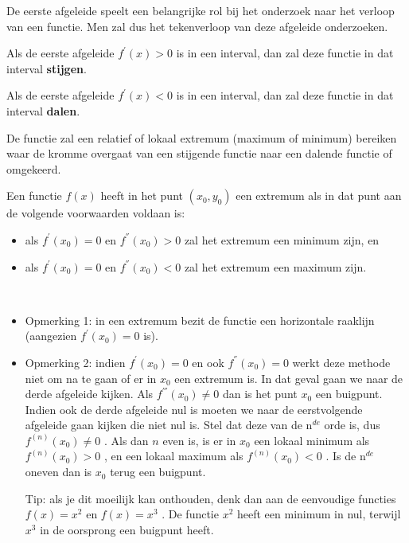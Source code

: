 De eerste afgeleide speelt een belangrijke rol bij het onderzoek
naar het verloop van een functie. Men zal dus het tekenverloop van
deze afgeleide onderzoeken.




\begin{definitie}
	Als de eerste afgeleide $f^{'}(x)>0$ is in een interval,
dan zal deze functie in dat interval \textbf{stijgen}.

Als de eerste afgeleide $f^{'}(x)<0$ is in een interval,
dan zal deze functie in dat interval \textbf{dalen}.

De functie zal een relatief of lokaal extremum (maximum
of minimum) bereiken waar de kromme overgaat van een stijgende functie
naar een dalende functie of omgekeerd.

Een functie $f(x)$ heeft in het punt $(x_{0},y_{0})$ een
extremum als in dat punt aan de volgende voorwaarden voldaan is:

\begin{itemize}
\item als $f^{'}(x_{0})=0$ en $f^{''}(x_{0})>0$ zal het
extremum een minimum zijn, en
\item als $f^{'}(x_{0})=0$ en $f^{''}(x_{0})<0$ zal het
extremum een maximum zijn.
\end{itemize}

\end{definitie}

\begin{opmerking}
	\ \\
	\begin{itemize}
\item Opmerking 1: in een extremum bezit de functie een horizontale
raaklijn (aangezien $f^{'}(x_{0})=0$ is).
\item Opmerking 2: indien $f^{'}(x_{0})=0$ en ook $f^{''}(x_{0})=0$
werkt deze methode niet om na te gaan of er in $x_{0}$ een extremum
is. In dat geval gaan we naar de derde afgeleide kijken. Als $f^{'''}(x_{0})\neq0$
dan is het punt $x_{0}$ een buigpunt. Indien ook de derde afgeleide
nul is moeten we naar de eerstvolgende afgeleide gaan kijken die niet
nul is. Stel dat deze van de n$^{de}$ orde is, dus $f^{(n)}(x_{0})\neq0$
. Als dan $n$ even is, is er in $x_{0}$ een lokaal minimum als $f^{(n)}(x_{0})>0$
, en een lokaal maximum als $f^{(n)}(x_{0})<0$ . Is de n$^{de}$
oneven dan is $x_{0}$ terug een buigpunt. 

Tip: als je dit moeilijk
kan onthouden, denk dan aan de eenvoudige functies $f(x)=x^{2}$ en
$f(x)=x^{3}$ . De functie $x^{2}$ heeft een minimum in nul, terwijl
$x^{3}$ in de oorsprong een buigpunt heeft.
\end{itemize}

\end{opmerking}



